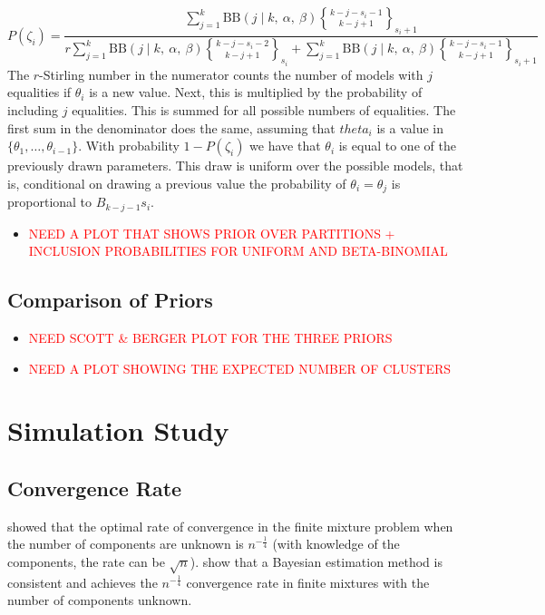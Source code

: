 \documentclass[11pt,a4paper]{article}
\theoremstyle{definition} %
\theoremstyle{case}
\newcommand{\BetaBinom}[4]{\text{BB}\left(#1 \mid #2 ,\ #3 ,\ #4 \right)}
\DeclareRobustCommand{\stirling}{\genfrac\{\}{0pt}{}}
\newcommand{\rstirling}[3]{\stirling{#1}{#2}_{#3}}
\newcommand{\bellnum}[1]{B_{#1}}
\begin{document}
\begin{equation}
    P(\zeta_i) = \frac{
        \sum_{j=1}^k \BetaBinom{j}{k}{\alpha}{\beta} \rstirling{k-j-s_i-1}{k-j+1}{s_i + 1}
    }{
        r \sum_{j=1}^k \BetaBinom{j}{k}{\alpha}{\beta} \rstirling{k-j-s_i-2}{k-j+1}{s_i    } +
          \sum_{j=1}^k \BetaBinom{j}{k}{\alpha}{\beta} \rstirling{k-j-s_i-1}{k-j+1}{s_i + 1}
    }
\end{equation}
The $r$-Stirling number in the numerator counts the number of models with $j$ equalities if $\theta_i$ is a new value. Next, this is multiplied by the probability of including $j$ equalities. This is summed for all possible numbers of equalities. 
The first sum in the denominator does the same, assuming that $theta_i$ is a value in $\{\theta_1, \dots, \theta_{i-1}\}$. With probability $1 - P(\zeta_i)$ we have that $\theta_i$ is equal to one of the previously drawn parameters. This draw is uniform over the possible models, that is, conditional on drawing a previous value the probability of $\theta_i = \theta_j$ is proportional to $\bellnum{k-j-1}{s_i}$.



\begin{itemize}
    \item \textcolor{red}{NEED A PLOT THAT SHOWS PRIOR OVER PARTITIONS + INCLUSION PROBABILITIES FOR UNIFORM AND BETA-BINOMIAL}
\end{itemize}

\subsection{Comparison of Priors}

\begin{itemize}
    \item \textcolor{red}{NEED SCOTT \& BERGER PLOT FOR THE THREE PRIORS}
    \item \textcolor{red}{NEED A PLOT SHOWING THE EXPECTED NUMBER OF CLUSTERS}
\end{itemize}



\section{Simulation Study}
\subsection{Convergence Rate}
\textcite{chen1995optimal} showed that the optimal rate of convergence in the finite mixture problem when the number of components are unknown is $n^{-\frac{1}{4}}$ (with knowledge of the components, the rate can be $\sqrt{n}$). \textcite{ishwaran2001bayesian} show that a Bayesian estimation method is consistent and achieves the $n^{-\frac{1}{4}}$ convergence rate in finite mixtures with the number of components unknown.
\end{document}
